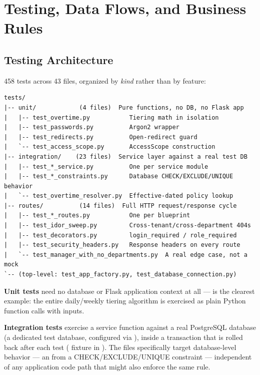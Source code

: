 \chapter{Testing, Data Flows, and Business Rules}

\section{Testing Architecture}

458 tests across 43 files, organized by \emph{kind} rather than by
feature:

\begin{lstlisting}[basicstyle=\ttfamily\footnotesize,frame=single]
tests/
|-- unit/            (4 files)  Pure functions, no DB, no Flask app
|   |-- test_overtime.py           Tiering math in isolation
|   |-- test_passwords.py          Argon2 wrapper
|   |-- test_redirects.py          Open-redirect guard
|   `-- test_access_scope.py       AccessScope construction
|-- integration/    (23 files)  Service layer against a real test DB
|   |-- test_*_service.py          One per service module
|   |-- test_*_constraints.py      Database CHECK/EXCLUDE/UNIQUE behavior
|   `-- test_overtime_resolver.py  Effective-dated policy lookup
|-- routes/          (14 files)  Full HTTP request/response cycle
|   |-- test_*_routes.py           One per blueprint
|   |-- test_idor_sweep.py         Cross-tenant/cross-department 404s
|   |-- test_decorators.py         login_required / role_required
|   |-- test_security_headers.py   Response headers on every route
|   `-- test_manager_with_no_departments.py  A real edge case, not a mock
`-- (top-level: test_app_factory.py, test_database_connection.py)
\end{lstlisting}

\textbf{Unit tests} need no database or Flask application context at
all ---  is the clearest example:
the entire daily/weekly tiering algorithm is exercised as plain Python
function calls with  inputs.

\textbf{Integration tests} exercise a service function against a real
PostgreSQL database (a dedicated test database, configured via
), inside a transaction that is rolled back
after each test ( fixture in
). The  files
specifically target database-level behavior --- an 
from a CHECK/EXCLUDE/UNIQUE constraint --- independent of any
application code path that might also enforce the same rule.

